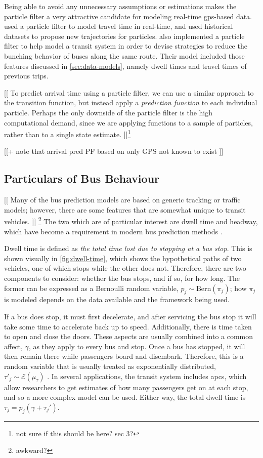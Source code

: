 \documentclass[12pt,a4paper]{article}
\newcommand{\pf}{particle filter}
\begin{document}
Being able to avoid any unnecessary assumptions or estimations makes the
\pf{} a very attractive candidate for modeling real-time \gls{gps}-based data.
\cite{chen-rakha:2014} used a \pf{} to model travel time in real-time,
and used historical datasets to propose new trajectories for particles.
\cite{hans-etal:2015} also implemented a \pf{} to help model a transit system
in order to devise strategies
to reduce the bunching behavior of buses along the same route.
Their model included those features discussed in \cref{sec:data-models},
namely dwell times and travel times of previous trips.


[[ To predict arrival time using a \pf{}, we can use a similar approach to the transition
function, but instead apply a \emph{prediction function} to each individual particle.
Perhaps the only downside of the \pf{} is the high computational demand,
since we are applying functions to a sample of particles, rather than to
a single state estimate. ]]\footnote{not sure if this should be here? sec 3?}

[[+ note that arrival pred PF based on only GPS not known to exist ]]



\subsection{Particulars of Bus Behaviour}
\label{sec:bus-behaviour}

[[ Many of the bus prediction models are based on generic tracking or traffic models;
however, there are some features that are somewhat unique to transit vehicles. ]]%
\footnote{awkward?}
The two which are of particular interest are dwell time and headway,
which have become a requirement in modern bus prediction methods
\citep{cn}.


Dwell time is defined as \emph{the total time lost due to stopping at a bus stop}.
This is shown visually in \cref{fig:dwell-time},
which shows the hypothetical paths of two vehicles, one of which stops while the other does not.
Therefore, there are two components to consider:
whether the bus stops, and if so, for how long.
The former can be expressed as a Bernoulli random variable, $p_j \sim \mathrm{Bern}(\pi_j)$;
how $\pi_j$ is modeled depends on the data available and the framework being used.


If a bus does stop, it must first decelerate,
and after servicing the bus stop it will take some time to accelerate back up to speed.
Additionally, there is time taken to open and close the doors.
These aspects are usually combined into a common affect, $\gamma$,
as they apply to every bus and stop.
Once a bus has stopped, it will then remain there while passengers board and disembark.
Therefore, this is a random variable that is usually treated as exponentially distributed,
$\tau'_j \sim \mathcal{E}(\mu_\tau)$
\citep{cn}.
In several applications, the transit system includes \glspl{apc},
which allow researchers to get estimates of how many passengers get on at each stop,
and so a more complex model can be used.
Either way, the total dwell time is $\tau_j = p_j(\gamma + \tau_j')$.
\end{document}
